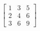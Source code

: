 \documentclass[UTF8]{ctexart}
\begin{document}
$$
\begin{bmatrix}
1 & 3 & 5\\
2 & 4 & 6\\
3 & 6 & 9
\end{bmatrix}
$$
\end{document}
